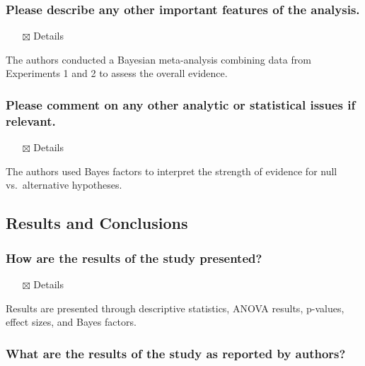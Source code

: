 \documentclass[
  doc, a4paper]{apa7}
\providecommand{\tightlist}{%
  \setlength{\itemsep}{0pt}\setlength{\parskip}{0pt}}
\begin{document}
\subsubsection{Please describe any other important features of the analysis.}\label{please-describe-any-other-important-features-of-the-analysis.}

\begin{itemize}
\tightlist
\item[$\boxtimes$]
  Details
\end{itemize}

The authors conducted a Bayesian meta-analysis combining data from Experiments 1 and 2 to assess the overall evidence.

\subsubsection{Please comment on any other analytic or statistical issues if relevant.}\label{please-comment-on-any-other-analytic-or-statistical-issues-if-relevant.}

\begin{itemize}
\tightlist
\item[$\boxtimes$]
  Details
\end{itemize}

The authors used Bayes factors to interpret the strength of evidence for null vs.~alternative hypotheses.

\subsection{Results and Conclusions}\label{results-and-conclusions}

\subsubsection{How are the results of the study presented?}\label{how-are-the-results-of-the-study-presented}

\begin{itemize}
\tightlist
\item[$\boxtimes$]
  Details
\end{itemize}

Results are presented through descriptive statistics, ANOVA results, p-values, effect sizes, and Bayes factors.

\subsubsection{What are the results of the study as reported by authors?}\label{what-are-the-results-of-the-study-as-reported-by-authors}
\end{document}
